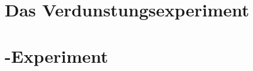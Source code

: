 
\label{sec:res}
\section{Das Verdunstungsexperiment}
\label{res:eva}
\section{\COT-Experiment}
\label{res:cot}
